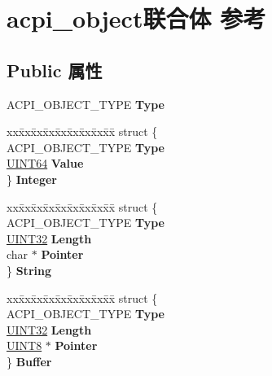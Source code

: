 \hypertarget{unionacpi__object}{}\section{acpi\+\_\+object联合体 参考}
\label{unionacpi__object}
\subsection*{Public 属性}
\begin{DoxyCompactItemize}
\item 
\mbox{\label{unionacpi__object_aa61067bff2fc99cf7f2e469dc92d0114}} 
A\+C\+P\+I\+\_\+\+O\+B\+J\+E\+C\+T\+\_\+\+T\+Y\+PE {\bfseries Type}
\item 
\mbox{\label{unionacpi__object_aab2db84403ffc4bcbe6d31b5c5a1d181}} 
\begin{tabbing}
xx\=xx\=xx\=xx\=xx\=xx\=xx\=xx\=xx\=\kill
struct \{\\
\>ACPI\_OBJECT\_TYPE {\bfseries Type}\\
\>\hyperlink{_processor_bind_8h_a57be03562867144161c1bfee95ca8f7c}{UINT64} {\bfseries Value}\\
\} {\bfseries Integer}\\

\end{tabbing}\item 
\mbox{\label{unionacpi__object_a738373372ac397ad50173ba400cf0c75}} 
\begin{tabbing}
xx\=xx\=xx\=xx\=xx\=xx\=xx\=xx\=xx\=\kill
struct \{\\
\>ACPI\_OBJECT\_TYPE {\bfseries Type}\\
\>\hyperlink{_processor_bind_8h_ae1e6edbbc26d6fbc71a90190d0266018}{UINT32} {\bfseries Length}\\
\>char $\ast$ {\bfseries Pointer}\\
\} {\bfseries String}\\

\end{tabbing}\item 
\mbox{\label{unionacpi__object_ae8307ac80aa639ca010dfddce079bf82}} 
\begin{tabbing}
xx\=xx\=xx\=xx\=xx\=xx\=xx\=xx\=xx\=\kill
struct \{\\
\>ACPI\_OBJECT\_TYPE {\bfseries Type}\\
\>\hyperlink{_processor_bind_8h_ae1e6edbbc26d6fbc71a90190d0266018}{UINT32} {\bfseries Length}\\
\>\hyperlink{_processor_bind_8h_ab27e9918b538ce9d8ca692479b375b6a}{UINT8} $\ast$ {\bfseries Pointer}\\
\} {\bfseries Buffer}\\


\end{tabbing}
\end{DoxyCompactItemize}
